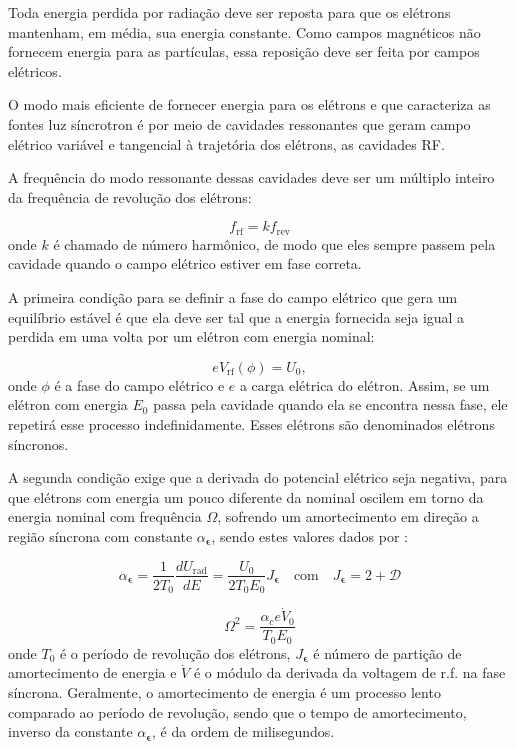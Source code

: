 Toda energia perdida por radiação deve ser reposta para que os elétrons mantenham, em média, sua energia constante. Como campos magnéticos não fornecem energia para as partículas, essa reposição deve ser feita por campos elétricos.

O modo mais eficiente de fornecer energia para os elétrons e que caracteriza as fontes luz síncrotron é por meio de cavidades ressonantes que geram campo elétrico variável e tangencial à trajetória dos elétrons, as cavidades RF.

A frequência do modo ressonante dessas cavidades deve ser um múltiplo inteiro da frequência de revolução dos elétrons:

\begin{equation}
 f_\mathrm{rf}=kf_\mathrm{rev}
\end{equation}
onde $k$ é chamado de número harmônico, de modo que eles sempre passem pela cavidade quando o campo elétrico estiver em fase correta. 

A primeira condição para se definir a fase do campo elétrico que gera um equilíbrio estável é que ela deve ser tal que a energia fornecida seja igual a perdida em uma volta por um elétron com energia nominal:

\begin{equation}
 e V_\mathrm{rf}(\phi)=U_0 ,
\end{equation}
onde $\phi$ é a fase do campo elétrico e $e$ a carga elétrica do elétron. Assim, se um elétron com energia $E_0$ passa pela cavidade quando ela se encontra nessa fase, ele repetirá esse processo indefinidamente. Esses elétrons são denominados elétrons síncronos.

A segunda condição exige que a derivada do potencial elétrico seja negativa, para que elétrons com energia um pouco diferente da nominal oscilem em torno da energia nominal com frequência $\Omega$, sofrendo um amortecimento em direção a região síncrona com constante $\alpha_{\boldsymbol{\epsilon}}$, sendo estes valores dados por \cite{Sands}:

\begin{equation}
 \alpha_{\boldsymbol{\epsilon}}=\frac{1}{2T_0}\frac{d U_\mathrm{rad}}{d E} =
 \frac{U_0}{2 T_0 E_0}J_{\boldsymbol{\epsilon}} \quad \text{com} \quad
 J_{\boldsymbol{\epsilon}} = 2+\mathcal{D}
\end{equation}

\begin{equation}
 \Omega^2 = \frac{\alpha_c e \dot{V}_0}{T_0 E_0} 
\end{equation}
onde $T_0$ é o período de revolução dos elétrons, $J_{\boldsymbol{\epsilon}}$ é número de partição de amortecimento de energia e $\dot{V}$ é o módulo da derivada da voltagem de r.f. na fase síncrona. Geralmente, o amortecimento de energia é um processo lento comparado ao período de revolução, sendo que o tempo de amortecimento, inverso da constante $\alpha_{\boldsymbol{\epsilon}}$, é da ordem de milisegundos.

